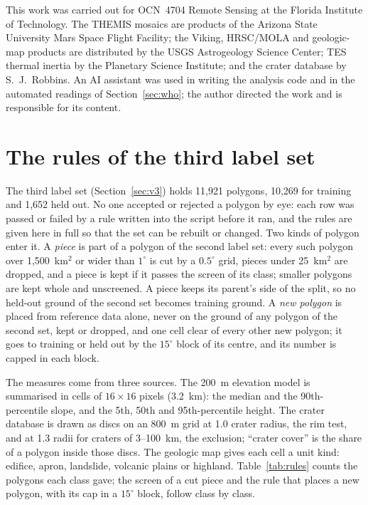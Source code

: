 \documentclass[twocolumn]{aastex701}
\begin{document}
\begin{acknowledgments}
This work was carried out for OCN~4704 Remote Sensing at the Florida Institute of Technology. The THEMIS mosaics are
products of the Arizona State University Mars Space Flight Facility; the Viking, HRSC/MOLA and geologic-map products are
distributed by the USGS Astrogeology Science Center; TES thermal inertia by the Planetary Science Institute; and the
crater database by S.~J.\ Robbins. An AI assistant was used in writing the analysis code and in the automated
readings of Section~\ref{sec:who}; the author directed the work and is responsible for its content.
\end{acknowledgments}



\appendix

\section{The rules of the third label set} \label{app:rules}

The third label set (Section~\ref{sec:v3}) holds 11,921 polygons, 10,269 for training and 1,652 held out. No one
accepted or rejected a polygon by eye: each row was passed or failed by a rule written into the script before it ran,
and the rules are given here in full so that the set can be rebuilt or changed. Two kinds of polygon enter it. A
\emph{piece} is part of a polygon of the second label set: every such polygon over 1,500~km$^2$ or wider than
$1^{\circ}$ is cut by a $0.5^{\circ}$ grid, pieces under 25~km$^2$ are dropped, and a piece is kept if it passes the
screen of its class; smaller polygons are kept whole and unscreened. A piece keeps its parent's side of the split, so
no held-out ground of the second set becomes training ground. A \emph{new polygon} is placed from reference data
alone, never on the ground of any polygon of the second set, kept or dropped, and one cell clear of every other new
polygon; it goes to training or held out by the $15^{\circ}$ block of its centre, and its number is capped in each
block. %

The measures come from three sources. The 200~m elevation model is summarised in cells of $16\times16$ pixels
(3.2~km): the median and the 90th-percentile slope, and the 5th, 50th and 95th-percentile height. The crater database
\citep{Robbins2012} is drawn as discs on an 800~m grid at 1.0 crater radius, the rim test, and at 1.3 radii for craters
of 3--100~km, the exclusion; ``crater cover'' is the share of a polygon inside those discs. The geologic map
\citep{Tanaka2014} gives each cell a unit kind: edifice, apron, landslide, volcanic plains or highland.
Table~\ref{tab:rules} counts the polygons each class gave; the screen of a cut piece and the rule that places a new
polygon, with its cap in a $15^{\circ}$ block, follow class by class. %
\end{document}
